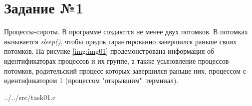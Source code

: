 \section*{Задание №1}

Процессы-сироты. В программе создаются не менее двух потомков. В потомках
вызывается \textit{sleep()}, чтобы предок гарантированно завершился раньше
своих потомков. На рисунке \ref{img:img01} продемонстрована информация об
идентификаторах процессов и их группе, а также усыновление процессов-потомков,
родительский процесс которых завершился раньше них, процессом с идентификатором
1 (процессом "открывшим"\ терминал).

\begin{lstinputlisting}[
	caption={Процессы-сироты},
	label={lst:orphan}
]{../../src/task01.c}
\end{lstinputlisting}

